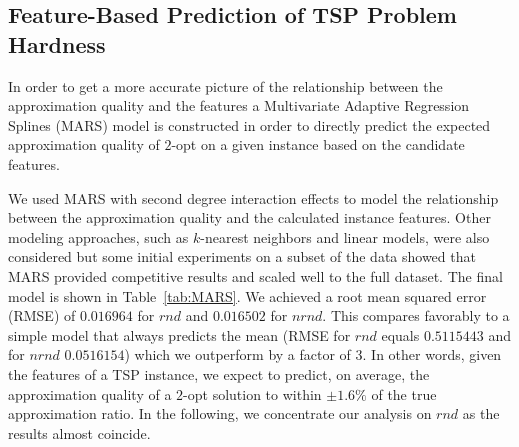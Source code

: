 \documentclass{article}
\begin{document}
\subsection{Feature-Based Prediction of TSP
  Problem Hardness}
\label{sec:MARS}

In order to get a more accurate picture of the relationship between
the approximation quality and the features a Multivariate Adaptive
Regression Splines (MARS) \cite{Friedman1991} model is constructed in
order to directly predict the expected approximation quality of
$2$-opt on a given instance based on the candidate features.

We used MARS with second degree interaction effects to model the
relationship between the approximation quality and the calculated
instance features. Other modeling approaches, such as $k$-nearest
neighbors and linear models, were also considered but some initial
experiments on a subset of the data showed that MARS provided
competitive results and scaled well to the full dataset. The final
model is shown in Table~\ref{tab:MARS}. We achieved a root mean
squared error (RMSE) of $0.016964$ for $rnd$ and $0.016502$ for
$nrnd$. This compares favorably to a simple model that always
predicts the mean (RMSE for $rnd$ equals $0.5115443$ and for $nrnd$
$0.0516154$) which we outperform by a factor of 3. In other words,
given the features of a TSP instance, we expect to predict, on
average, the approximation quality of a $2$-opt solution to within
$\pm 1.6\%$ of the true approximation ratio. In the following, we concentrate our analysis on $rnd$ as the results almost coincide.
\end{document}
